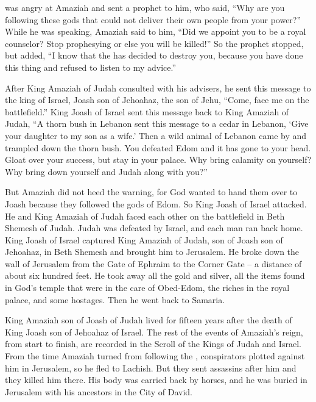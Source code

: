{was angry
at Amaziah
and sent
a prophet
to him,
who said,
“Why
are you following
these
gods
that
could
not
deliver
their own people
from your power?”
While
he was speaking,
Amaziah
said
to him,
“Did we
appoint you
to be a royal
counselor? Stop
prophesying or else
you will be killed!” So the prophet
stopped,
but added, “I know
that
the
{} has
decided
to destroy
you, because
you have done
this
thing and refused
to listen
to my advice.”
\par }{\PP {}After King
Amaziah
of Judah
consulted
with his advisers, he sent
this message to
the king
of Israel,
Joash
son
of Jehoahaz,
the son
of Jehu,
“Come, face
me on the battlefield.”
King
Joash
of Israel
sent
this message
back to
King
Amaziah
of Judah,
“A thorn
bush in Lebanon
sent
this message to
a cedar
in Lebanon,
‘Give
your daughter
to my son
as a wife.’
Then
a wild
animal
of Lebanon
came by and trampled
down the
thorn bush.
You defeated
Edom
and it
has gone to your head. Gloat
over your success,
but stay
in your palace.
Why
bring calamity
on
yourself? Why bring down
yourself
and Judah
along with you?”
\par }{\PP {}But Amaziah
did not
heed
the warning, for
God
wanted
to hand
them over to Joash because
they followed
the gods
of Edom.
So King
Joash
of Israel
attacked.
He and King
Amaziah
of Judah
faced
each other on the battlefield
in Beth Shemesh
of Judah.
Judah
was defeated
by Israel,
and each man
ran
back home.
King
Joash
of Israel
captured
King
Amaziah
of Judah,
son
of Joash
son
of Jehoahaz,
in Beth Shemesh
and brought
him to Jerusalem.
He broke down
the wall
of Jerusalem
from the Gate
of Ephraim
to
the Corner Gate
– a distance
of about six hundred feet.
He took away all
the gold
and silver,
all
the items
found
in God’s
temple
that were in the care of Obed-Edom,
the riches
in the
royal
palace,
and some hostages.
Then he went back
to Samaria.
\par }{\PP {}King
Amaziah
son
of Joash
of Judah
lived
for fifteen
years
after
the death
of King
Joash
son
of Jehoahaz
of Israel.
The rest
of the events
of Amaziah’s
reign, from start
to finish,
are recorded
in the Scroll
of the Kings
of Judah
and Israel.
From the time
Amaziah
turned
from following
the {}, conspirators
plotted against
him in
Jerusalem,
so he fled
to Lachish.
But they sent
assassins after
him
and they killed
him there.
His body was carried
back by horses,
and he was buried
in Jerusalem with
his ancestors
in the City of David.

}
